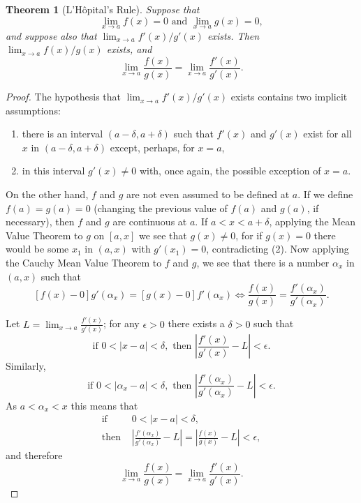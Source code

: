 \documentclass{article}
\numberwithin{corollary}{subsection}
\numberwithin{definition}{subsection}
\numberwithin{lemma}{subsection}
\newtheorem{theorem}{Theorem}
\numberwithin{theorem}{subsection}
\begin{document}
\begin{theorem}[L'H{\^o}pital's Rule]
  Suppose that \[
    \lim_{x \to a} f(x) = 0 \text{ and } \lim_{x \to a} g(x) = 0,
  \] and suppose also that $\lim_{x \to a} f'(x)/g'(x)$ exists. Then
  $\lim_{x \to a} f(x)/g(x)$ exists, and \[
    \lim_{x \to a} \frac{f(x)}{g(x)} = \lim_{x \to a} \frac{f'(x)}{g'(x)}.
  \]
\end{theorem}

\begin{proof}
  The hypothesis that $\lim_{x \to a} f'(x)/g'(x)$ exists contains two implicit
  assumptions:
  \begin{enumerate}
    \item there is an interval $(a - \delta, a + \delta)$ such that $f'(x)$ and
      $g'(x)$ exist for all $x$ in $(a - \delta, a + \delta)$ except, perhaps,
      for $x = a$,
    \item in this interval $g'(x) \neq 0$ with, once again, the possible
      exception of $x = a$.
  \end{enumerate}
  On the other hand, $f$ and $g$ are not even assumed to be defined at $a$. If
  we define $f(a) = g(a) = 0$ (changing the previous value of $f(a)$ and
  $g(a)$, if necessary), then $f$ and $g$ are continuous at $a$. If $a < x < a
  + \delta$, applying the Mean Value Theorem to $g$ on $[a, x]$ we see that
  $g(x) \neq 0$, for if $g(x) = 0$ there would be some $x_1$ in $(a, x)$ with
  $g'(x_1) = 0$, contradicting (2). Now applying the Cauchy Mean Value Theorem
  to $f$ and $g$, we see that there is a number $\alpha_x$ in $(a, x)$ such
  that \[
    [f(x) - 0]g'(\alpha_x) = [g(x) - 0]f'(\alpha_x)
    \iff \frac{f(x)}{g(x)} = \frac{f'(\alpha_x)}{g'(\alpha_x)}.
  \]

  Let $L = \lim_{x \rightarrow a} \frac{f'(x)}{g'(x)}$; for any $\epsilon > 0$
  there exists a $\delta > 0$ such that \[
    \text{if } 0 < |x - a| < \delta,
    \text{ then } \left|\frac{f'(x)}{g'(x)} - L\right| < \epsilon.
  \] Similarly, \[
    \text{if } 0 < |\alpha_x - a| < \delta,
    \text{ then } \left|\frac{f'(\alpha_x)}{g'(\alpha_x)} - L\right|
    < \epsilon.
  \] As $a < \alpha_x < x$ this means that
  \begin{align*}
    \text{if } &0 < |x - a| < \delta, \\
    \text{then } &\left|\frac{f'(\alpha_x)}{g'(\alpha_x)} - L\right|
    = \left|\frac{f(x)}{g(x)} - L\right| < \epsilon,
  \end{align*}
  and therefore \[
    \lim_{x \to a} \frac{f(x)}{g(x)} = \lim_{x \to a} \frac{f'(x)}{g'(x)}.
  \]
\end{proof}
\end{document}
